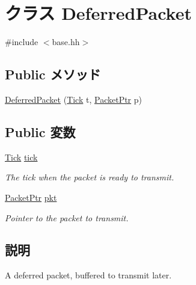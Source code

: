 \hypertarget{classBasePrefetcher_1_1DeferredPacket}{
\section{クラス DeferredPacket}
\label{classBasePrefetcher_1_1DeferredPacket}
}


{\ttfamily \#include $<$base.hh$>$}\subsection*{Public メソッド}
\begin{DoxyCompactItemize}
\item 
\hyperlink{classBasePrefetcher_1_1DeferredPacket_ab130ef186edfc2a1928d00d723a11fc0}{DeferredPacket} (\hyperlink{base_2types_8hh_a5c8ed81b7d238c9083e1037ba6d61643}{Tick} t, \hyperlink{classPacket}{PacketPtr} p)
\end{DoxyCompactItemize}
\subsection*{Public 変数}
\begin{DoxyCompactItemize}
\item 
\hyperlink{base_2types_8hh_a5c8ed81b7d238c9083e1037ba6d61643}{Tick} \hyperlink{classBasePrefetcher_1_1DeferredPacket_a4daae57fbf09ee5423d123f5ce330e92}{tick}
\begin{DoxyCompactList}\small\item\em The tick when the packet is ready to transmit. \item\end{DoxyCompactList}\item 
\hyperlink{classPacket}{PacketPtr} \hyperlink{classBasePrefetcher_1_1DeferredPacket_a3a891bc2a0fcbe6be5297077d94e2df7}{pkt}
\begin{DoxyCompactList}\small\item\em Pointer to the packet to transmit. \item\end{DoxyCompactList}\end{DoxyCompactItemize}


\subsection{説明}
A deferred packet, buffered to transmit later. 


